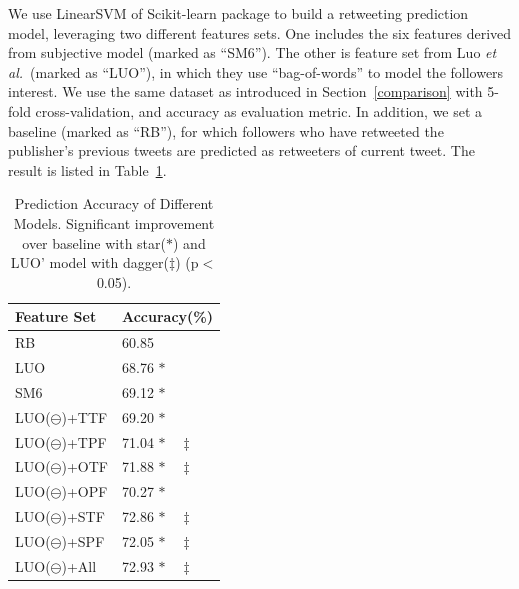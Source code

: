 \documentclass{acm_proc_article-sp}
\begin{document}
We use LinearSVM of Scikit-learn package to build a retweeting prediction model, leveraging two different features sets. One includes the six features derived from subjective model (marked as ``SM6''). The other is feature set from Luo \emph{et al.}~\cite{Luo:2013RMF}(marked as ``LUO''), in which they use ``bag-of-words'' to model the followers interest.  We use the same dataset as introduced in Section~\ref{comparison} with 5-fold cross-validation, and accuracy as evaluation metric.
In addition, we set a baseline (marked as ``RB''), for which followers who have retweeted the publisher's previous tweets are predicted as retweeters of current tweet. 
The result is listed in Table~\ref{table2}.
\begin{table}
\centering
\caption{Prediction Accuracy of Different Models. Significant improvement over baseline with star($ \ast $) and LUO' model with dagger($ \ddagger $) (p$ < $0.05).}
\label{table2}
\begin{tabular}{|l|l|}
\hline
Feature Set & Accuracy(\%) \\
\hline
RB & 60.85  \\
LUO & 68.76 $ \ast  $\\
SM6 & 69.12  $ \ast $ \\
LUO($ \ominus $)+TTF & 69.20  $ \ast $ \\
LUO($ \ominus $)+TPF & 71.04  $ \ast \quad \ddagger $ \\
LUO($ \ominus $)+OTF & 71.88  $ \ast \quad \ddagger $ \\
LUO($ \ominus $)+OPF & 70.27  $ \ast $ \\
LUO($ \ominus $)+STF & 72.86  $ \ast \quad \ddagger $ \\
LUO($ \ominus $)+SPF & 72.05  $ \ast \quad \ddagger $ \\
LUO($ \ominus $)+All & 72.93  $ \ast \quad \ddagger $ \\
\hline
\end{tabular}
\end{table}
\end{document}
